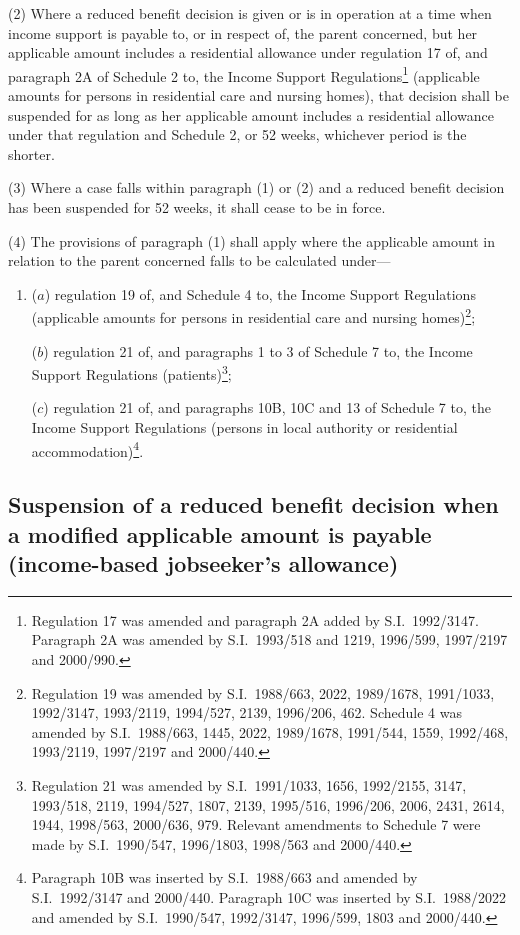 \documentclass[12pt,a4paper]{article}
\begin{document}
(2) Where a reduced benefit decision is given or is in operation at a time when income support is payable to, or in respect of, the parent concerned, but her applicable amount includes a residential allowance under regulation 17 of, and paragraph 2A of Schedule 2 to, the Income Support Regulations\footnote{Regulation 17 was amended and paragraph 2A added by S.I.\ 1992/3147. Paragraph 2A was amended by S.I.\ 1993/518 and 1219, 1996/599, 1997/2197 and 2000/990.} (applicable amounts for persons in residential care and nursing homes), that decision shall be suspended for as long as her applicable amount includes a residential allowance under that regulation and Schedule 2, or 52 weeks, whichever period is the shorter.

(3) Where a case falls within paragraph (1) or (2) and a reduced benefit decision has been suspended for 52 weeks, it shall cease to be in force.

(4) The provisions of paragraph (1) shall apply where the applicable amount in relation to the parent concerned falls to be calculated under—
\begin{enumerate}\item[]
($a$) regulation 19 of, and Schedule 4 to, the Income Support Regulations (applicable amounts for persons in residential care and nursing homes)\footnote{Regulation 19 was amended by S.I.\ 1988/663, 2022, 1989/1678, 1991/1033, 1992/3147, 1993/2119, 1994/527, 2139, 1996/206, 462. Schedule 4 was amended by S.I.\ 1988/663, 1445, 2022, 
1989/1678, 1991/544, 1559, 1992/468, 1993/2119, 1997/2197 and 2000/440.};

($b$) regulation 21 of, and paragraphs 1 to 3 of Schedule 7 to, the Income Support Regulations (patients)\footnote{Regulation 21 was amended by S.I.\ 1991/1033, 1656, 1992/2155, 3147, 1993/518, 2119, 1994/527, 1807, 2139, 1995/516, 1996/206, 2006, 2431, 2614, 1944, 1998/563, 2000/636, 979. Relevant amendments to Schedule 7 were made by S.I.\ 1990/547, 1996/1803, 1998/563 and 2000/440.};

($c$) regulation 21 of, and paragraphs 10B, 10C and 13 of Schedule 7 to, the Income Support Regulations (persons in local authority or residential accommodation)\footnote{Paragraph 10B was inserted by S.I.\ 1988/663 and amended by S.I.\ 1992/3147 and 2000/440. Paragraph 10C was inserted by S.I.\ 1988/2022 and amended by S.I.\ 1990/547, 1992/3147, 1996/599, 1803 and 2000/440.}.
\end{enumerate}

\subsection[15. Suspension of a reduced benefit decision when a modified applicable amount is payable (income-based jobseeker’s allowance)]{Suspension of a reduced benefit decision when a modified applicable amount is payable (income-based jobseeker’s allowance)}
\end{document}
